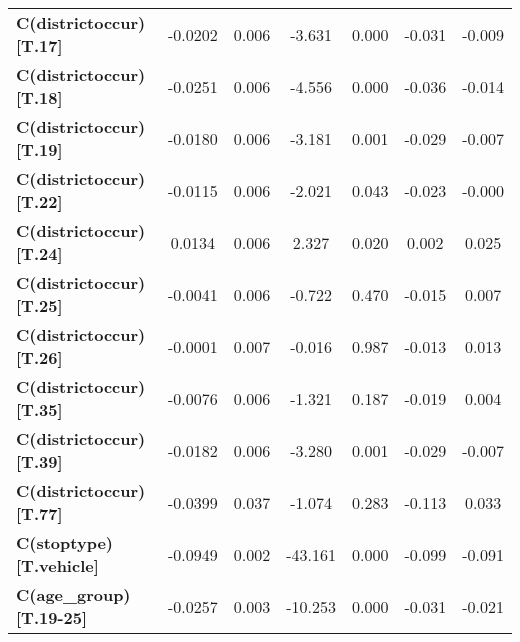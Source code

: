 \begin{center}
\begin{tabular}{lcccccc}
\textbf{C(districtoccur)[T.17]}                                                   &      -0.0202  &        0.006     &    -3.631  &         0.000        &       -0.031    &       -0.009     \\
\textbf{C(districtoccur)[T.18]}                                                   &      -0.0251  &        0.006     &    -4.556  &         0.000        &       -0.036    &       -0.014     \\
\textbf{C(districtoccur)[T.19]}                                                   &      -0.0180  &        0.006     &    -3.181  &         0.001        &       -0.029    &       -0.007     \\
\textbf{C(districtoccur)[T.22]}                                                   &      -0.0115  &        0.006     &    -2.021  &         0.043        &       -0.023    &       -0.000     \\
\textbf{C(districtoccur)[T.24]}                                                   &       0.0134  &        0.006     &     2.327  &         0.020        &        0.002    &        0.025     \\
\textbf{C(districtoccur)[T.25]}                                                   &      -0.0041  &        0.006     &    -0.722  &         0.470        &       -0.015    &        0.007     \\
\textbf{C(districtoccur)[T.26]}                                                   &      -0.0001  &        0.007     &    -0.016  &         0.987        &       -0.013    &        0.013     \\
\textbf{C(districtoccur)[T.35]}                                                   &      -0.0076  &        0.006     &    -1.321  &         0.187        &       -0.019    &        0.004     \\
\textbf{C(districtoccur)[T.39]}                                                   &      -0.0182  &        0.006     &    -3.280  &         0.001        &       -0.029    &       -0.007     \\
\textbf{C(districtoccur)[T.77]}                                                   &      -0.0399  &        0.037     &    -1.074  &         0.283        &       -0.113    &        0.033     \\
\textbf{C(stoptype)[T.vehicle]}                                                   &      -0.0949  &        0.002     &   -43.161  &         0.000        &       -0.099    &       -0.091     \\
\textbf{C(age\_group)[T.19-25]}                                                   &      -0.0257  &        0.003     &   -10.253  &         0.000        &       -0.031    &       -0.021     \\

\end{tabular}
\end{center}
